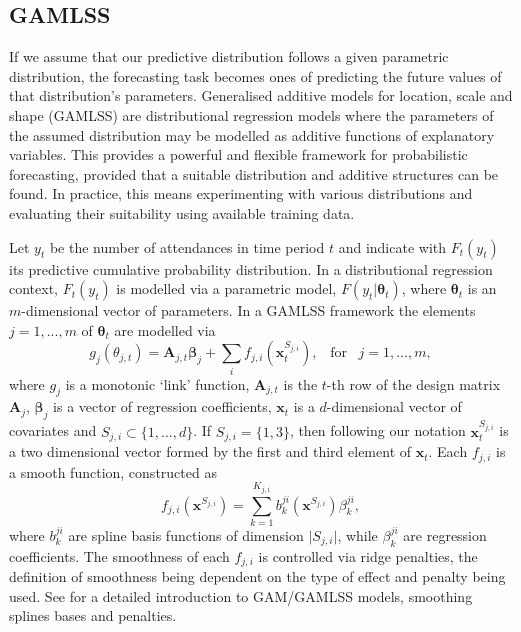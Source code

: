 \documentclass[]{elsarticle} %
\begin{document}
\hypertarget{gamlss}{%
\subsection{GAMLSS}\label{gamlss}}

If we assume that our predictive distribution follows a given parametric distribution, the forecasting task becomes ones of predicting the future values of that distribution's parameters. Generalised additive models for location, scale and shape (GAMLSS) are distributional regression models where the parameters of the assumed distribution may be modelled as additive functions of explanatory variables. This provides a powerful and flexible framework for probabilistic forecasting, provided that a suitable distribution and additive structures can be found. In practice, this means experimenting with various distributions and evaluating their suitability using available training data.

Let \(y_t\) be the number of attendances in time period \(t\) and indicate with \(F_t(y_t)\) its predictive cumulative probability distribution. In a distributional regression context, \(F_t(y_t)\) is modelled via a parametric model, \(F(y_t|\bm \theta_t)\), where \(\bm \theta_t\) is an \(m\)-dimensional vector of parameters. In a GAMLSS framework \cite{Rigby2005} the elements \(j=1,...,m\) of \(\bm \theta_t\) are modelled via
\begin{equation} \label{eq:basicGAM}
    g_j(\theta_{j,t})=\mathbf{A}_{j,t} \bm{\beta}_j + \sum_{i} f_{j,i}({\bm x}^{S_{j,i}}_t), \;\;\; \text{for} \;\;\; j = 1, \dots, m,
\end{equation}
where \(g_j\) is a monotonic `link' function, \(\mathbf{A}_{j,t}\) is the \(t\)-th row of the design matrix \(\mathbf{A}_j\), \(\bm \beta_j\) is a vector of regression coefficients, \(\bm x_t\) is a \(d\)-dimensional vector of covariates and \(S_{j,i} \subset \{1, \dots, d\}\). If \(S_{j,i} = \{1, 3\}\), then following our notation \({\bm x}_{t}^{S_{j,i}}\) is a two dimensional vector formed by the first and third element of \(\bm x_t\). Each \(f_{j,i}\) is a smooth function, constructed as
\begin{equation}
    f_{j,i}(\bm x^{S_{j,i}}) = \sum_{k=1}^{K_{j,i}} b^{ji}_k (\bm x^{S_{j,i}}) \beta_k^{ji},
\end{equation}
where \(b^{ji}_k\) are spline basis functions of dimension \(\vert S_{j,i} \vert\), while \(\beta_k^{ji}\) are regression coefficients. The smoothness of each \(f_{j,i}\) is controlled via ridge penalties, the definition of smoothness being dependent on the type of effect and penalty being used. See \cite{Wood2017} for a detailed introduction to GAM/GAMLSS models, smoothing splines bases and penalties.
\end{document}
